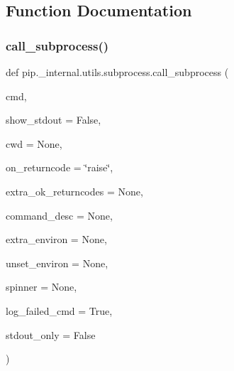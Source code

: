 \subsection{Function Documentation}
\mbox{\label{namespacepip_1_1__internal_1_1utils_1_1subprocess_abba62bba85561b170942cc705f7a325a}} 
\subsubsection{\texorpdfstring{call\+\_\+subprocess()}{call\_subprocess()}}
{\footnotesize\ttfamily def pip.\+\_\+internal.\+utils.\+subprocess.\+call\+\_\+subprocess (\begin{DoxyParamCaption}\item[{}]{cmd,  }\item[{}]{show\+\_\+stdout = {\ttfamily False},  }\item[{}]{cwd = {\ttfamily None},  }\item[{}]{on\+\_\+returncode = {\ttfamily \char`\"{}raise\char`\"{}},  }\item[{}]{extra\+\_\+ok\+\_\+returncodes = {\ttfamily None},  }\item[{}]{command\+\_\+desc = {\ttfamily None},  }\item[{}]{extra\+\_\+environ = {\ttfamily None},  }\item[{}]{unset\+\_\+environ = {\ttfamily None},  }\item[{}]{spinner = {\ttfamily None},  }\item[{}]{log\+\_\+failed\+\_\+cmd = {\ttfamily True},  }\item[{}]{stdout\+\_\+only = {\ttfamily False} }\end{DoxyParamCaption})}

